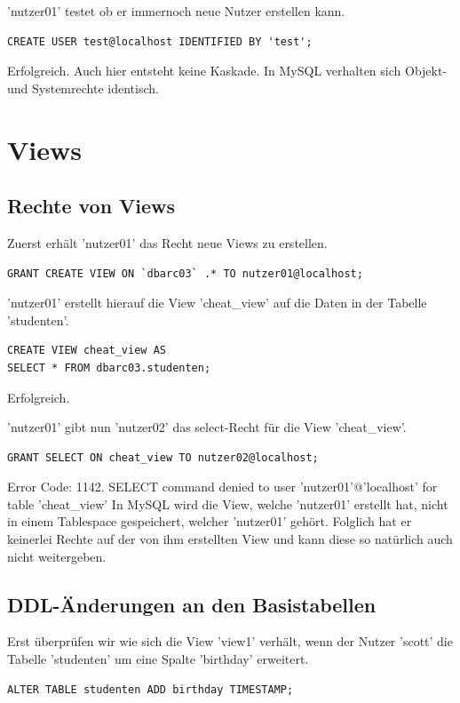 \documentclass[10pt]{scrreprt}
\begin{document}
'nutzer01' testet ob er immernoch neue Nutzer erstellen kann.
\begin{lstlisting}[style=sql]
CREATE USER test@localhost IDENTIFIED BY 'test';
\end{lstlisting}
Erfolgreich.
\newline\newline
Auch hier entsteht keine Kaskade. In MySQL verhalten sich Objekt- und Systemrechte identisch.

\section{Views}
\subsection{Rechte von Views}
Zuerst erhält 'nutzer01' das Recht neue Views zu erstellen.
\begin{lstlisting}[style=sql]
GRANT CREATE VIEW ON `dbarc03` .* TO nutzer01@localhost;
\end{lstlisting}

'nutzer01' erstellt hierauf die View 'cheat\_view' auf die Daten in der Tabelle 'studenten'.
\begin{lstlisting}[style=sql]
CREATE VIEW cheat_view AS
SELECT * FROM dbarc03.studenten;
\end{lstlisting}
Erfolgreich.

'nutzer01' gibt nun 'nutzer02' das select-Recht für die View 'cheat\_view'.
\begin{lstlisting}[style=sql]
GRANT SELECT ON cheat_view TO nutzer02@localhost;
\end{lstlisting}
Error Code: 1142. SELECT command denied to user 'nutzer01'@'localhost' for table 'cheat\_view'\newline\newline
In MySQL wird die View, welche 'nutzer01' erstellt hat, nicht in einem Tablespace gespeichert, welcher 'nutzer01' gehört. Folglich hat er keinerlei Rechte auf der von ihm erstellten View und kann diese so natürlich auch nicht weitergeben.
\newpage
\subsection{DDL-Änderungen an den Basistabellen}
Erst überprüfen wir wie sich die View 'view1' verhält, wenn der Nutzer 'scott' die Tabelle 'studenten' um eine Spalte 'birthday' erweitert.
\begin{lstlisting}[style=sql]
ALTER TABLE studenten ADD birthday TIMESTAMP;
\end{lstlisting}
\end{document}
